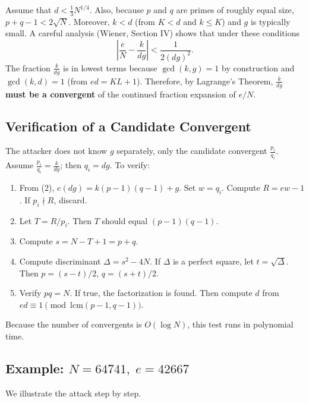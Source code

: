 Assume that \(d < \frac13 N^{1/4}\). Also, because \(p\) and \(q\) are primes of roughly equal size, \(p+q-1 < 2\sqrt{N}\). Moreover, \(k < d\) (from \(K<d\) and \(k \le K\)) and \(g\) is typically small. A careful analysis (Wiener, Section IV) shows that under these conditions
\[
\left| \frac{e}{N} - \frac{k}{d g} \right| < \frac{1}{2 (d g)^2}. \tag{4}
\]
The fraction \(\frac{k}{d g}\) is in lowest terms because \(\gcd(k,g)=1\) by construction and \(\gcd(k,d)=1\) (from \(ed = KL+1\)). Therefore, by Lagrange's Theorem, \(\frac{k}{d g}\) \textbf{must be a convergent} of the continued fraction expansion of \(e/N\).

\subsection*{Verification of a Candidate Convergent}

The attacker does not know \(g\) separately, only the candidate convergent \(\frac{p_i}{q_i}\). Assume \(\frac{p_i}{q_i} = \frac{k}{d g}\); then \(q_i = d g\). To verify:
\begin{enumerate}
\item From (2), \(e (d g) = k (p-1)(q-1) + g\). Set \(w = q_i\). Compute \(R = e w - 1\). If \(p_i \nmid R\), discard.
\item Let \(T = R / p_i\). Then \(T\) should equal \((p-1)(q-1)\).
\item Compute \(s = N - T + 1 = p+q\).
\item Compute discriminant \(\Delta = s^2 - 4N\). If \(\Delta\) is a perfect square, let \(t = \sqrt{\Delta}\). Then \(p = (s-t)/2\), \(q = (s+t)/2\).
\item Verify \(pq = N\). If true, the factorization is found. Then compute \(d\) from \(e d \equiv 1 \pmod{\mathrm{lcm}(p-1,q-1)}\).
\end{enumerate}
Because the number of convergents is \(O(\log N)\), this test runs in polynomial time.


\subsection*{ Example: \(N = 64741,\; e = 42667\)}

We illustrate the attack step by step.

